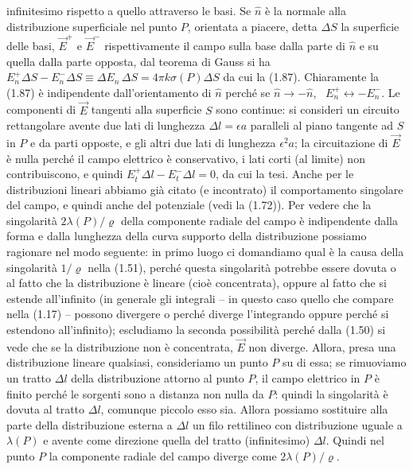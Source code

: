 infinitesimo rispetto a quello attraverso le basi. Se $\hat n$ \`e la normale
alla distribuzione superficiale nel punto $P$, orientata a piacere, detta
$\Delta S$ la superficie delle basi, $\vec E^+$ e $\vec E^-$ rispettivamente il
campo sulla base dalla parte di $\hat n$ e su quella dalla parte opposta, dal
teorema di Gauss si ha
$E_n^+\Delta S-E_n^-\Delta S\equiv\Delta E_n\,\Delta S=4\pi k\sigma(P)\Delta S$
da cui la (1.87). Chiaramente la (1.87) \`e indipendente dall'orientamento di
$\hat n$ perch\'e se $\hat n\to-\hat n$, \ $E_n^+\leftrightarrow-E_n^-$.
Le componenti di $\vec E$ tangenti alla superficie $S$ sono continue: si
consideri un circuito rettangolare avente due lati di lunghezza
$\Delta l=\epsilon a$ paralleli al piano tangente ad $S$ in $P$ e da parti
opposte, e gli altri due lati di lunghezza $\epsilon^2a$; la circuitazione di
$\vec E$ \`e nulla perch\'e il campo elettrico \`e conservativo, i lati corti
(al limite) non contribuiscono, e quindi $E_t^+\Delta l-E_t^-\Delta l=0$, da cui
la tesi.
Anche per le distribuzioni lineari abbiamo gi\`a citato (e incontrato) il
comportamento singolare del campo, e quindi anche del potenziale \big(vedi la
(1.72)\big). Per vedere che la singolarit\`a $2\lambda(P)/\varrho$ della
componente radiale del campo \`e indipendente dalla forma e dalla lunghezza
della curva supporto della distribuzione possiamo ragionare nel modo seguente:
in primo luogo ci domandiamo qual \`e la causa della singolarit\`a $1/\varrho$
nella (1.51), perch\'e questa singolarit\`a potrebbe essere dovuta o al fatto
che la distribuzione \`e lineare (cio\`e concentrata), oppure al fatto che si
estende all'infinito (in generale gli integrali -- in questo caso quello che
compare nella (1.17) -- possono divergere o perch\'e diverge l'integrando oppure
perch\'e si estendono all'infinito); escludiamo la seconda possibilit\`a
perch\'e dalla (1.50) si vede che se la distribuzione non \`e concentrata,
$\vec E$ non diverge. Allora, presa una distribuzione lineare qualsiasi,
consideriamo un punto $P$ su di essa; se rimuoviamo un tratto $\Delta l$ della
distribuzione attorno al punto $P$, il campo elettrico in $P$ \`e finito
perch\'e le sorgenti sono a distanza non nulla da $P$: quindi la singolarit\`a
\`e dovuta al tratto $\Delta l$, comunque piccolo esso sia. Allora possiamo
sostituire alla parte della distribuzione esterna a $\Delta l$ un filo
rettilineo con distribuzione uguale a $\lambda(P)$ e avente come direzione
quella del tratto (infinitesimo) $\Delta l$. Quindi nel punto $P$ la componente
radiale del campo diverge come $2\lambda(P)/\varrho$.

